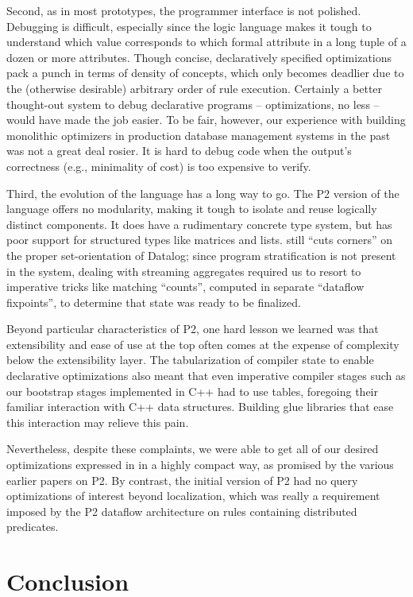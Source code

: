 Second, as in most prototypes, the programmer interface is not polished.
Debugging is difficult, especially since the logic language makes it tough to
understand which value corresponds to which formal attribute in a long tuple of
a dozen or more attributes.  Though concise, declaratively specified
optimizations pack a punch in terms of density of concepts, which only becomes
deadlier due to the (otherwise desirable) arbitrary order of rule execution.
Certainly a better thought-out system to debug declarative programs --
optimizations, no less -- would have made the job easier.  To be fair, however,
our experience with building monolithic optimizers in production database
management systems in the past was not a great deal rosier.  It is hard to
debug code when the output's correctness (e.g., minimality of cost) is too
expensive to verify.

Third, the evolution of the \OVERLOG language has a long way to go.  The P2
version of the language offers no modularity, making it tough to isolate and
reuse logically distinct components.  It does have a rudimentary concrete type
system, but has poor support for structured types like matrices and lists.
\OVERLOG still ``cuts corners'' on the proper set-orientation of Datalog; since
program stratification is not present in the system, dealing with streaming
aggregates required us to resort to imperative tricks like matching ``counts'',
computed in separate ``dataflow fixpoints'', to determine that state was ready
to be finalized.

Beyond particular characteristics of P2, one hard lesson we learned was that
extensibility and ease of use at the top often comes at the expense of
complexity below the extensibility layer.  The tabularization of compiler state
to enable declarative optimizations also meant that even imperative compiler
stages such as our bootstrap stages implemented in C++ had to use tables,
foregoing their familiar interaction with C++ data structures.  Building glue
libraries that ease this interaction may relieve this pain.

Nevertheless, despite these complaints, we were able to get all of our desired
optimizations expressed in \OVERLOG in a highly compact way, as promised by the
various earlier papers on P2.  By contrast, the initial version of P2 had no
query optimizations of interest beyond localization, which was really a
requirement imposed by the P2 dataflow architecture on rules containing
distributed predicates.

\section{Conclusion} 
\label{ch:opt:sec:summary} 

